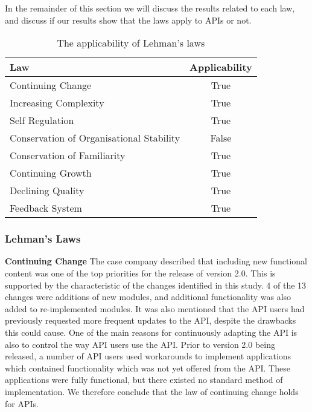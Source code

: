 \documentclass{sig-alternate}
\begin{document}
In the remainder of this section we will discuss the results related to each law, and discuss if our results show that the laws apply to APIs or not.


\begin{table}
       \centering
       \begin{tabular}[ht]{l|c}
              \toprule

              \textbf{Law}                              & \textbf{Applicability}    \\ \midrule
              Continuing Change                         & True                      \\ \hline
              Increasing Complexity                     & True                     \\ \hline
              Self Regulation                           & True                      \\ \hline
              Conservation of Organisational Stability  & False                     \\ \hline
              Conservation of Familiarity               & True                      \\ \hline
              Continuing Growth                         & True                      \\ \hline
              Declining Quality                         & True                     \\ \hline
              Feedback System                           & True                      \\ 

              \bottomrule

       \end{tabular}
       \caption{The applicability of Lehman's laws}
       \label{table:lehman}
\end{table}


\subsubsection{Lehman's Laws}

\smallskip \noindent
\textbf{Continuing Change  } 
The case company described that including new functional content was one of the top priorities for the release of version 2.0. This is supported by the characteristic of the changes identified in this study. 4 of the 13 changes were additions of new modules, and additional functionality was also added to re-implemented modules. It was also mentioned that the API users had previously requested more frequent updates to the API, despite the drawbacks this could cause. One of the main reasons for continuously adapting the API is also to control the way API users use the API. Prior to version 2.0 being released, a number of API users used workarounds to implement applications which contained functionality which was not yet offered from the API. These applications were fully functional, but there existed no standard method of implementation. We therefore conclude that the law of continuing change holds for APIs. 
\end{document}
